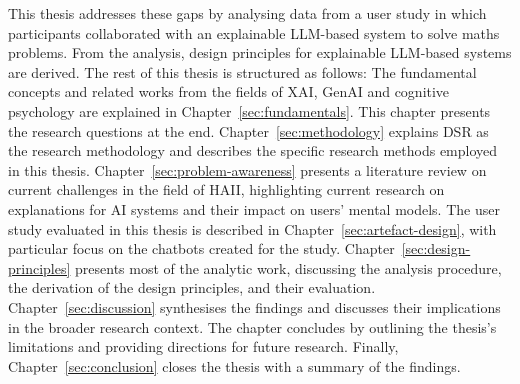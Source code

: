 This thesis addresses these gaps by analysing data from a user study in which participants collaborated with an explainable \ac{LLM}-based system to solve maths problems. From the analysis, design principles for explainable \ac{LLM}-based systems are derived. The rest of this thesis is structured as follows: The fundamental concepts and related works from the fields of \ac{XAI}, \ac{GenAI} and cognitive psychology are explained in Chapter~\ref{sec:fundamentals}. This chapter presents the research questions at the end. Chapter~\ref{sec:methodology} explains \ac{DSR} as the research methodology and describes the specific research methods employed in this thesis. Chapter~\ref{sec:problem-awareness} presents a literature review on current challenges in the field of \ac{HAII}, highlighting current research on explanations for \ac{AI} systems and their impact on users' mental models. The user study evaluated in this thesis is described in Chapter~\ref{sec:artefact-design}, with particular focus on the chatbots created for the study. Chapter~\ref{sec:design-principles} presents most of the analytic work, discussing the analysis procedure, the derivation of the design principles, and their evaluation. Chapter~\ref{sec:discussion} synthesises the findings and discusses their implications in the broader research context. The chapter concludes by outlining the thesis's limitations and providing directions for future research. Finally, Chapter~\ref{sec:conclusion} closes the thesis with a summary of the findings.
